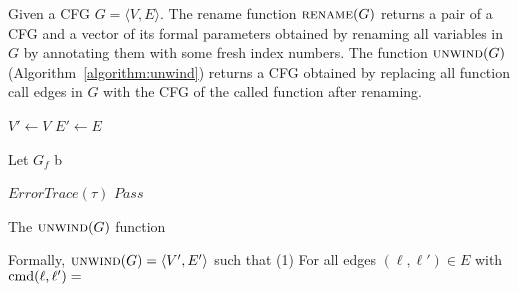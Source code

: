 Given a CFG $G=\langle
V, E \rangle$. The rename function $\textsc{rename}(G)$ returns a pair of a CFG and a vector of its formal parameters obtained by renaming all variables in $G$ by annotating them with some fresh index numbers. The function $\textsc{unwind}(G)$ (Algorithm~\ref{algorithm:unwind}) returns a CFG obtained by replacing all function call edges in $G$ with the CFG of the called function after renaming. 
\begin{algorithm}
  $V' \leftarrow V$\;
  $E' \leftarrow E$\;
  {
  	Let $G_f$ b
  
    {
      \Return $\mathit{ErrorTrace} (\tau)$\;
    }
    {
      \Return $\mathit{Pass}$\;
    }
  }
  \caption{The $\textsc{unwind}(G)$ function}
  \label{algorithm:unwind}
\end{algorithm}


Formally, $\textsc{unwind}(G) = \langle
V', E' \rangle$ such that 
(1) For all edges $(\ell, \ell')\in E$ with $\textmd{cmd} (\ell, \ell')=$